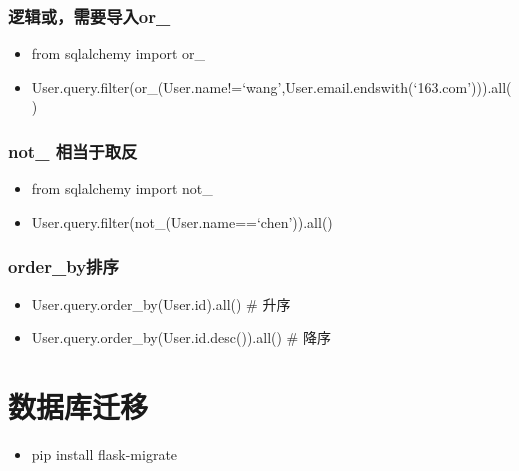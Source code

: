 \documentclass[11pt]{article}
\providecommand{\tightlist}{%
      \setlength{\itemsep}{0pt}\setlength{\parskip}{0pt}}
\begin{document}
\hypertarget{ux903bux8f91ux6216ux9700ux8981ux5bfcux5165or_}{%
\subsubsection{逻辑或，需要导入or\_}\label{ux903bux8f91ux6216ux9700ux8981ux5bfcux5165or_}}

\begin{itemize}
\tightlist
\item
  from sqlalchemy import or\_
\item
  User.query.filter(or\_(User.name!=`wang',User.email.endswith(`163.com'))).all()
\end{itemize}

\hypertarget{not_-ux76f8ux5f53ux4e8eux53d6ux53cd}{%
\subsubsection{not\_
相当于取反}\label{not_-ux76f8ux5f53ux4e8eux53d6ux53cd}}

\begin{itemize}
\tightlist
\item
  from sqlalchemy import not\_
\item
  User.query.filter(not\_(User.name==`chen')).all()
\end{itemize}

\hypertarget{order_byux6392ux5e8f}{%
\subsubsection{order\_by排序}\label{order_byux6392ux5e8f}}

\begin{itemize}
\tightlist
\item
  User.query.order\_by(User.id).all() \# 升序
\item
  User.query.order\_by(User.id.desc()).all() \# 降序
\end{itemize}

    \hypertarget{ux6570ux636eux5e93ux8fc1ux79fb}{%
\section{数据库迁移}\label{ux6570ux636eux5e93ux8fc1ux79fb}}

\begin{itemize}
\tightlist
\item
  pip install flask-migrate
\end{itemize}
\end{document}
